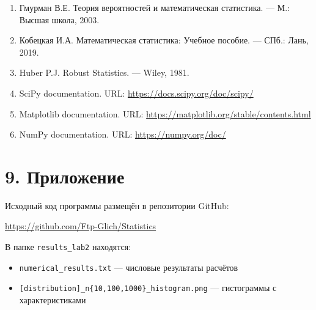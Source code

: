 \documentclass[a4paper,14pt]{extarticle}
\begin{document}
\begin{enumerate}
    \item Гмурман В.Е. Теория вероятностей и математическая статистика. — М.: Высшая школа, 2003.
    
    \item Кобецкая И.А. Математическая статистика: Учебное пособие. — СПб.: Лань, 2019.
    
    \item Huber P.J. Robust Statistics. — Wiley, 1981.
    
    \item SciPy documentation. URL: \url{https://docs.scipy.org/doc/scipy/}
    
    \item Matplotlib documentation. URL: \url{https://matplotlib.org/stable/contents.html}
    
    \item NumPy documentation. URL: \url{https://numpy.org/doc/}
\end{enumerate}

\section*{9. Приложение}

Исходный код программы размещён в репозитории GitHub:

\url{https://github.com/Ftp-Glich/Statistics}

В папке \texttt{results\_lab2} находятся:
\begin{itemize}
    \item \texttt{numerical\_results.txt} — числовые результаты расчётов
    \item \texttt{[distribution]\_n\{10,100,1000\}\_histogram.png} — гистограммы с характеристиками
\end{itemize}
\end{document}
